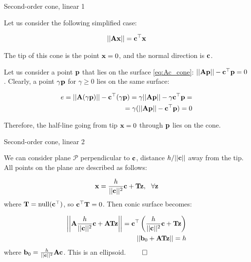 \documentclass{beamer}
\begin{document}
\begin{frame}{Second-order cone, linear 1}
	\begin{flushleft}
		
		Let us consider the following simplified case:
		
		\begin{equation}
			\label{eq:Ac_cone}
			||\mathbf{A}\mathbf{x}|| = \mathbf{c}^\top \mathbf{x}
		\end{equation}
		
		The tip of this cone is the point $\mathbf{x} = 0$, and the normal direction is $\mathbf{c}$.
		
		\bigskip
		
		Let us consider a point $\mathbf{p}$ that lies on the surface \eqref{eq:Ac_cone}: $||\mathbf{A}\mathbf{p}|| - \mathbf{c}^\top \mathbf{p} = 0$. Clearly, a point $\gamma \mathbf{p}$ for $\gamma \geq 0$ lies on the same surface:
		
		\begin{align*}
			e = ||\mathbf{A}(\gamma\mathbf{p})|| - \mathbf{c}^\top (\gamma \mathbf{p}) = 
			\gamma||\mathbf{A}\mathbf{p}|| - \gamma \mathbf{c}^\top \mathbf{p} = \\
			= \gamma(||\mathbf{A}\mathbf{p}|| -\mathbf{c}^\top \mathbf{p}) =0
		\end{align*}
		
		Therefore, the half-line going from tip $\mathbf{x} = 0$ through $\mathbf{p}$ lies on the cone. 
		
	\end{flushleft}
\end{frame}


\begin{frame}{Second-order cone, linear 2}
	\begin{flushleft}
		
		We can consider plane $\mathcal P$ perpendicular to $\mathbf{c}$, distance $h / ||\mathbf{c}||$ away from the tip. All points on the plane are described as follows:
		
		\begin{align}
			\bo{x} = \frac{h}{||\bo{c}||^2} \bo{c} + \bo{T} \bo{z}, \ \ \forall \bo{z}
		\end{align}
		where $\mathbf{T} = \text{null}(\mathbf{c}^\top)$, so $\mathbf{c}^\top\mathbf{T} = 0$. Then conic surface becomes:
		
		\begin{align}
			\left|\left|\mathbf{A}\frac{h}{||\mathbf{c}||^2} \mathbf{c} + \mathbf{A} \mathbf{T} \mathbf{z}\right|\right| = \mathbf{c}^\top \left(\frac{h}{||\mathbf{c}||^2} \mathbf{c} + \mathbf{T} \mathbf{z} \right)
			\\ 
			||\mathbf{b}_0 + \mathbf{A} \mathbf{T} \mathbf{z}|| = h
		\end{align}
	where $\mathbf{b}_0 = \frac{h}{||\mathbf{c}||^2} \mathbf{A} \mathbf{c}$. This is an ellipsoid. $\qed$
		
	\end{flushleft}
\end{frame}
\end{document}
